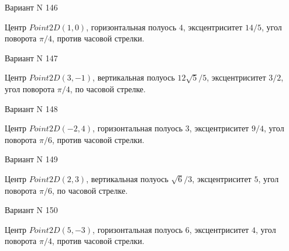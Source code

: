 \documentclass[11pt]{report}
\begin{document}
Вариант N 146

Центр $Point2D\left(1, 0\right)$, горизонтальная полуось $4$, эксцентриситет $14 / 5$, угол поворота $\pi / 4$, против часовой стрелки.

Вариант N 147

Центр $Point2D\left(3, -1\right)$, вертикальная полуось $12 \sqrt{5} / 5$, эксцентриситет $3 / 2$, угол поворота $\pi / 4$, по часовой стрелке.

Вариант N 148

Центр $Point2D\left(-2, 4\right)$, горизонтальная полуось $3$, эксцентриситет $9 / 4$, угол поворота $\pi / 6$, против часовой стрелки.

Вариант N 149

Центр $Point2D\left(2, 3\right)$, вертикальная полуось $\sqrt{6} / 3$, эксцентриситет $5$, угол поворота $\pi / 6$, по часовой стрелке.

Вариант N 150

Центр $Point2D\left(5, -3\right)$, горизонтальная полуось $6$, эксцентриситет $4$, угол поворота $\pi / 4$, против часовой стрелки.
\end{document}
